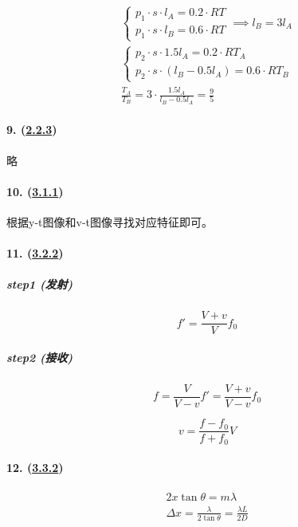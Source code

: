 \begin{gather*}
    \begin{cases}
        p_1\cdot s\cdot l_A=0.2\cdot RT\\
        p_1\cdot s\cdot l_B=0.6\cdot RT
    \end{cases}\implies l_B=3l_A\\
    \begin{cases}
        p_2\cdot s\cdot 1.5l_A=0.2\cdot RT_A\\
        p_2\cdot s\cdot (l_B-0.5l_A)=0.6\cdot RT_B
    \end{cases}\\
    \frac{T_A}{T_B}=3\cdot\frac{1.5l_A}{l_B-0.5l_A}=\frac95
\end{gather*}

\paragraph{9. (\hyperref[subsec:2.2.3]{2.2.3})} 略
\paragraph{10. (\hyperref[subsec:3.1.1]{3.1.1})} 根据y-t图像和v-t图像寻找对应特征即可。
\paragraph{11. (\hyperref[subsec:3.2.2]{3.2.2})}

\subparagraph{step1 (发射)}

\begin{equation*}
    f'=\frac{V+v}{V}f_0
\end{equation*}

\subparagraph{step2 (接收)}

\begin{equation*}
    f=\frac{V}{V-v}f'=\frac{V+v}{V-v}f_0
\end{equation*}

\begin{equation*}
    v=\frac{f-f_0}{f+f_0}V
\end{equation*}

\paragraph{12. (\hyperref[subsec:3.3.2]{3.3.2})}

\begin{gather*}
    2x\tan\theta=m\lambda\\
    \Delta x=\frac{\lambda}{2\tan\theta}=\frac{\lambda L}{2D}
\end{gather*}

